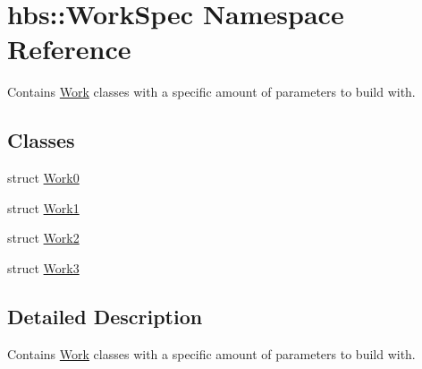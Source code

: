 \hypertarget{namespacehbs_1_1_work_spec}{\section{hbs\-:\-:Work\-Spec Namespace Reference}
\label{namespacehbs_1_1_work_spec}
}


Contains \hyperlink{classhbs_1_1_work}{Work} classes with a specific amount of parameters to build with.  


\subsection*{Classes}
\begin{DoxyCompactItemize}
\item 
struct \hyperlink{structhbs_1_1_work_spec_1_1_work0}{Work0}
\item 
struct \hyperlink{structhbs_1_1_work_spec_1_1_work1}{Work1}
\item 
struct \hyperlink{structhbs_1_1_work_spec_1_1_work2}{Work2}
\item 
struct \hyperlink{structhbs_1_1_work_spec_1_1_work3}{Work3}
\end{DoxyCompactItemize}


\subsection{Detailed Description}
Contains \hyperlink{classhbs_1_1_work}{Work} classes with a specific amount of parameters to build with. 